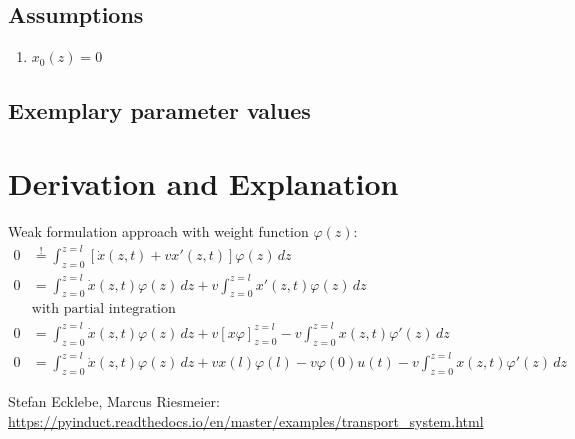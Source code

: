 \documentclass[10pt,a4paper]{article}
\begin{document}
	
	\subsection{Assumptions} %
		\begin{enumerate} %
			\item $x_0(z)=0$
		\end{enumerate}
	
	
	\subsection{Exemplary parameter values}
	

	
	\section{Derivation and Explanation} %
	Weak formulation approach with weight function $\varphi(z)$:
	\begin{align*}
		0 &\stackrel{!}{=} \int_{z=0}^{z=l} [ \dot{x}(z,t) + v x'(z,t) ] \varphi(z) \,dz   \\
		0&=\int_{z=0}^{z=l} \dot{x}(z,t) \varphi(z) \,dz + v \int_{z=0}^{z=l}x'(z,t) \varphi(z) \,dz  \\
		&\text{with partial integration} \\
		0&=\int_{z=0}^{z=l} \dot{x}(z,t) \varphi(z) \,dz + v[x\varphi]_{z=0}^{z=l} - v \int_{z=0}^{z=l}x(z,t) \varphi'(z) \,dz   \\
		0&=\int_{z=0}^{z=l} \dot{x}(z,t) \varphi(z) \,dz + vx(l)\varphi(l) - v\varphi(0)u(t) - v \int_{z=0}^{z=l}x(z,t) \varphi'(z) \,dz
	\end{align*}


	
	
	\begin{thebibliography}{10}		
		Stefan Ecklebe, Marcus Riesmeier: \\
		\href{https://pyinduct.readthedocs.io/en/master/examples/transport_system.html}{https://pyinduct.readthedocs.io/en/master/examples/transport\_system.html}
	\end{thebibliography}
\end{document}

